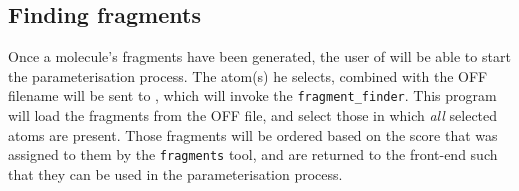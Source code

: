 \subsection{Finding fragments}
Once a molecule's fragments have been generated, the user of \oframp{} will be able to start the parameterisation process. The atom(s) he selects, combined with the OFF filename will be sent to \omfraf, which will invoke the \verb|fragment_finder|. This program will load the fragments from the OFF file, and select those in which \emph{all} selected atoms are present. Those fragments will be ordered based on the score that was assigned to them by the \verb|fragments| tool, and are returned to the \oframp{} front-end such that they can be used in the parameterisation process.

